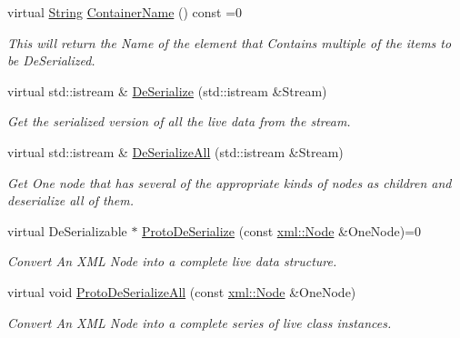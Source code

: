 \begin{DoxyCompactItemize}
\item 
virtual \hyperlink{namespaceMezzanine_acf9fcc130e6ebf08e3d8491aebcf1c86}{String} \hyperlink{classMezzanine_1_1DeSerializer_a99e25b2dab4cde22af1c77fa31665bae}{ContainerName} () const =0
\begin{DoxyCompactList}\small\item\em This will return the Name of the element that Contains multiple of the items to be DeSerialized. \item\end{DoxyCompactList}\item 
virtual std::istream \& \hyperlink{classMezzanine_1_1DeSerializer_aaf31c38d936ec89323c3cb9196a5a97f}{DeSerialize} (std::istream \&Stream)
\begin{DoxyCompactList}\small\item\em Get the serialized version of all the live data from the stream. \item\end{DoxyCompactList}\item 
virtual std::istream \& \hyperlink{classMezzanine_1_1DeSerializer_ab2765b0fe8f803344c6965df50333073}{DeSerializeAll} (std::istream \&Stream)
\begin{DoxyCompactList}\small\item\em Get One node that has several of the appropriate kinds of nodes as children and deserialize all of them. \item\end{DoxyCompactList}\item 
virtual DeSerializable $\ast$ \hyperlink{classMezzanine_1_1DeSerializer_a646390cf8138c622c64aa83a93b10cce}{ProtoDeSerialize} (const \hyperlink{classMezzanine_1_1xml_1_1Node}{xml::Node} \&OneNode)=0
\begin{DoxyCompactList}\small\item\em Convert An XML Node into a complete live data structure. \item\end{DoxyCompactList}\item 
virtual void \hyperlink{classMezzanine_1_1DeSerializer_ad3dc2a569986dfcd169cc341d85a7d74}{ProtoDeSerializeAll} (const \hyperlink{classMezzanine_1_1xml_1_1Node}{xml::Node} \&OneNode)
\begin{DoxyCompactList}\small\item\em Convert An XML Node into a complete series of live class instances. \item\end{DoxyCompactList}\end{DoxyCompactItemize}


